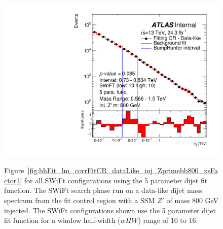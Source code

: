 \begin{figure}[!htb]
{}
 {
  \includegraphics[width=0.48\linewidth, angle=0]{figs/Dibjet/LowMass/FitStudy_min566/bhFit_corrFitCR_dataLike_5para_low10_high10_inj_Zprimebb800_xsFactor1.pdf}
}
\vspace{10pt}
\caption[Figure~\ref{fig:bhFit_lm_corrFitCR_dataLike_inj_Zprimebb800_xsFactor1} for all SWiFt configurations using the 5 parameter dijet fit function.]
{\label{fig:app-bhFit_lm_corrFitCR_dataLike_inj_Zprimebb800_xsFactor1_5para}
Figure~\ref{fig:bhFit_lm_corrFitCR_dataLike_inj_Zprimebb800_xsFactor1} for all SWiFt configurations using the 5 parameter dijet fit function.    
  The SWiFt search phase run on a data-like dijet mass spectrum
  from the fit control region with a SSM $Z'$ of mass 800 GeV injected.
  The SWiFt configurations shown use the 5 parameter dijet fit function for a window half-width ($wHW$) range of 10 to 16.
}
\end{figure}

